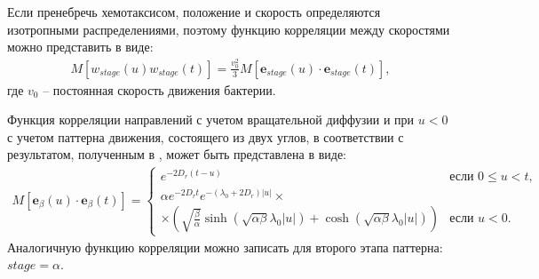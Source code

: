 Если пренебречь хемотаксисом, положение и скорость определяются изотропными распределениями, поэтому функцию корреляции между скоростями можно представить в виде:
\begin{equation}
    \begin{aligned}
        M[w_{stage}(u)w_{stage}(t)]=\frac{v_0^2}{3} M \left [\textbf{e}_{stage}(u) \cdot \textbf{e}_{stage}(t) \right ],
    \label{eq:speed-correlation-function}
    \end{aligned}
\end{equation}
где $v_0$ -- постоянная скорость движения бактерии.

Функция корреляции направлений с учетом вращательной диффузии и при $u < 0$ с учетом паттерна движения, состоящего из двух углов, в соответствии с результатом, полученным в \cite{taktikos_how_2013}, может быть представлена в виде:
\begin{equation}
    \begin{aligned}
        M[\textbf{e}_{\beta}(u) \cdot \textbf{e}_{\beta}(t)] = 
        \begin{cases}
            e^{-2D_r(t-u)} & \text{если } 0 \leq u < t, \\
            \alpha e^{-2D_r t} e^{-(\lambda_0+2D_r)|u|} \times \\ 
            \times \left ( \sqrt{\frac{\beta}{\alpha}} \sinh \left (\sqrt{\alpha \beta} \lambda_0 |u|\right ) + \cosh \left (\sqrt{\alpha \beta} \lambda_0 |u|\right ) \right ) & \text{если } u < 0.
        \end{cases}        
    \label{eq:direction-correlation-function}
    \end{aligned}
\end{equation}
Аналогичную функцию корреляции можно записать для второго этапа паттерна: $stage=\alpha$.

